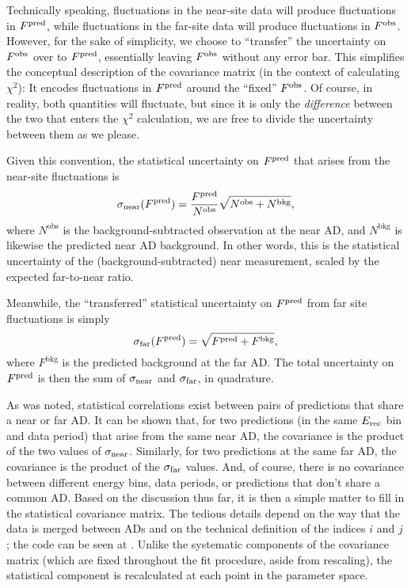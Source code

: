 \documentclass[../thesis.tex]{subfiles}
\begin{document}
Technically speaking, fluctuations in the near-site data will produce fluctuations in $F^{\mathrm{pred}}$, while fluctuations in the far-site data will produce fluctuations in $F^{\mathrm{obs}}$. However, for the sake of simplicity, we choose to ``transfer'' the uncertainty on $F^{\mathrm{obs}}$ over to $F^{\mathrm{pred}}$, essentially leaving $F^{\mathrm{obs}}$ without any error bar. This simplifies the conceptual description of the covariance matrix (in the context of calculating $\chi^2$): It encodes fluctuations in $F^{\mathrm{pred}}$ around the ``fixed'' $F^{\mathrm{obs}}$. Of course, in reality, both quantities will fluctuate, but since it is only the \emph{difference} between the two that enters the $\chi^2$ calculation, we are free to divide the uncertainty between them as we please.

Given this convention, the statistical uncertainty on $F^{\mathrm{pred}}$ that arises from the near-site fluctuations is
\begin{equation}
  \sigma_{\mathrm{near}}(F^{\mathrm{pred}}) = \frac{F^{\mathrm{pred}}}{N^{\mathrm{obs}}} \sqrt{N^{\mathrm{obs}} + N^{\mathrm{bkg}}},
\end{equation}
where $N^{\mathrm{obs}}$ is the background-subtracted observation at the near AD, and $N^{\mathrm{bkg}}$ is likewise the predicted near AD background. In other words, this is the statistical uncertainty of the (background-subtracted) near measurement, scaled by the expected far-to-near ratio.

Meanwhile, the ``transferred'' statistical uncertainty on $F^{\mathrm{pred}}$ from far site fluctuations is simply
\begin{equation}
  \sigma_{\mathrm{far}}(F^{\mathrm{pred}}) = \sqrt{F^{\mathrm{pred}} + F^{\mathrm{bkg}}},
\end{equation}
where $F^{\mathrm{bkg}}$ is the predicted background at the far AD. The total uncertainty on $F^{\mathrm{pred}}$ is then the sum of $\sigma_{\mathrm{near}}$ and $\sigma_{\mathrm{far}}$, in quadrature.

As was noted, statistical correlations exist between pairs of predictions that share a near or far AD. It can be shown
that, for two predictions (in the same $E_\mathrm{rec}$ bin and data period) that arise from the same near AD, the covariance is the product of the two values of $\sigma_{\mathrm{near}}$. Similarly, for two predictions at the same far AD, the covariance is the product of the $\sigma_{\mathrm{far}}$ values. And, of course, there is no covariance between different energy bins, data periods, or predictions that don't share a common AD. Based on the discussion thus far, it is then a simple matter to fill in the statistical covariance matrix. The tedious details depend on the way that the data is merged between ADs and on the technical definition of the indices $i$ and $j$; the code can be seen at \cite[ShapeFit/Predictor.C, Calculate(NearSite)StatError]{DybBerkFit}. Unlike the systematic components of the covariance matrix (which are fixed throughout the fit procedure, aside from rescaling), the statistical component is recalculated at each point in the parameter space.
\end{document}
